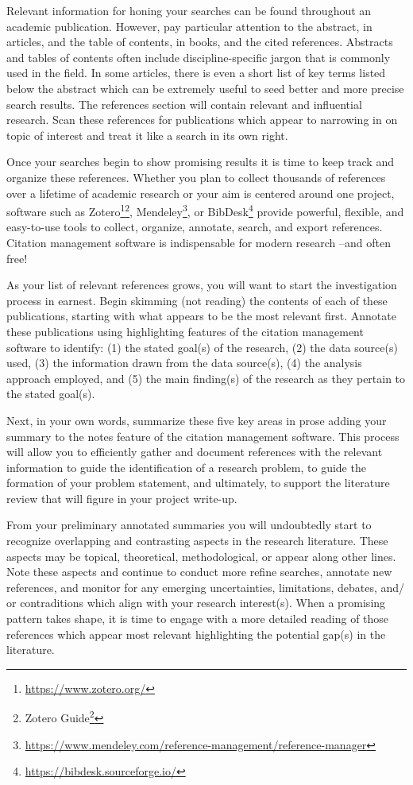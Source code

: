 \documentclass[
  letterpaper,
]{latex/krantz}
\theoremstyle{definition}
\theoremstyle{remark}
\DeclareRobustCommand{\href}[2]{#2\footnote{\url{#1}}}
\begin{document}
Relevant information for honing your searches can be found throughout an
academic publication. However, pay particular attention to the abstract,
in articles, and the table of contents, in books, and the cited
references. Abstracts and tables of contents often include
discipline-specific jargon that is commonly used in the field. In some
articles, there is even a short list of key terms listed below the
abstract which can be extremely useful to seed better and more precise
search results. The references section will contain relevant and
influential research. Scan these references for publications which
appear to narrowing in on topic of interest and treat it like a search
in its own right.

Once your searches begin to show promising results it is time to keep
track and organize these references. Whether you plan to collect
thousands of references over a lifetime of academic research or your aim
is centered around one project, software such as
\href{https://www.zotero.org/}{Zotero}\footnote{\href{https://guides.zsr.wfu.edu/zotero}{Zotero
  Guide}},
\href{https://www.mendeley.com/reference-management/reference-manager}{Mendeley},
or \href{https://bibdesk.sourceforge.io/}{BibDesk} provide powerful,
flexible, and easy-to-use tools to collect, organize, annotate, search,
and export references. Citation management software is indispensable for
modern research --and often free!

As your list of relevant references grows, you will want to start the
investigation process in earnest. Begin skimming (not reading) the
contents of each of these publications, starting with what appears to be
the most relevant first. Annotate these publications using highlighting
features of the citation management software to identify: (1) the stated
goal(s) of the research, (2) the data source(s) used, (3) the
information drawn from the data source(s), (4) the analysis approach
employed, and (5) the main finding(s) of the research as they pertain to
the stated goal(s).

Next, in your own words, summarize these five key areas in prose adding
your summary to the notes feature of the citation management software.
This process will allow you to efficiently gather and document
references with the relevant information to guide the identification of
a research problem, to guide the formation of your problem statement,
and ultimately, to support the literature review that will figure in
your project write-up.

From your preliminary annotated summaries you will undoubtedly start to
recognize overlapping and contrasting aspects in the research
literature. These aspects may be topical, theoretical, methodological,
or appear along other lines. Note these aspects and continue to conduct
more refine searches, annotate new references, and monitor for any
emerging uncertainties, limitations, debates, and/ or contraditions
which align with your research interest(s). When a promising pattern
takes shape, it is time to engage with a more detailed reading of those
references which appear most relevant highlighting the potential gap(s)
in the literature.
\end{document}
